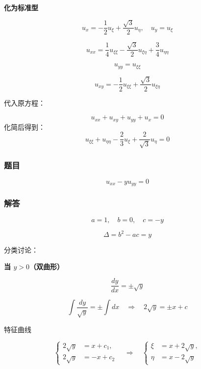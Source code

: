 \textbf{化为标准型}

\[
u_x = -\frac{1}{2} u_{\xi} + \frac{\sqrt{3}}{2} u_{\eta}, \quad u_y = u_{\xi}
\]

\[
u_{xx} = \frac{1}{4} u_{\xi \xi} - \frac{\sqrt{3}}{2} u_{\xi \eta} + \frac{3}{4} u_{\eta \eta}
\]

\[
u_{yy} = u_{\xi \xi}
\]

\[
u_{xy} = -\frac{1}{2} u_{\xi \xi} + \frac{\sqrt{3}}{2} u_{\xi \eta}
\]

代入原方程：

\[
u_{xx} + u_{xy} + u_{yy} + u_x = 0
\]
化简后得到：
\[
u_{\xi \xi} + u_{\eta \eta} - \frac{2}{3} u_{\xi} + \frac{2}{\sqrt{3}} u_{\eta} = 0
\]

\subsubsection*{题目}
\[
u_{xx} - y u_{yy} = 0
\]

\subsubsection*{解答}

\[
a = 1, \quad b = 0, \quad c = -y
\]

\[
\Delta = b^2 - ac = y
\]

分类讨论：

\textbf{当 $y > 0$（双曲形）}

\[
\frac{dy}{dx} = \pm \sqrt{y}
\]

\[
\int \frac{dy}{\sqrt{y}} = \pm \int dx \quad \Longrightarrow \quad 2\sqrt{y} = \pm x + c
\]

特征曲线

\[
\left\{
\begin{aligned}
2\sqrt{y} &= x + c_1, \\
2\sqrt{y} &= -x + c_2
\end{aligned}
\right.
\quad \Longrightarrow \quad
\left\{
\begin{aligned}
\xi &= x + 2\sqrt{y}, \\
\eta &= x - 2\sqrt{y}
\end{aligned}
\right.
\]

